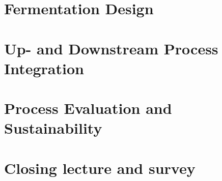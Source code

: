 \documentclass[]{beamer}
\begin{document}
\begin{CJK}{UTF8}{gbsn}
\section{Fermentation Design}
\section{Up- and Downstream Process Integration}
\section{Process Evaluation and Sustainability}
\section{Closing lecture and survey}

\end{CJK}
\end{document}
